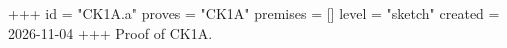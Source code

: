 +++
id = "CK1A.a"
proves = "CK1A"
premises = []
level = "sketch"
created = 2026-11-04
+++
Proof of CK1A.
